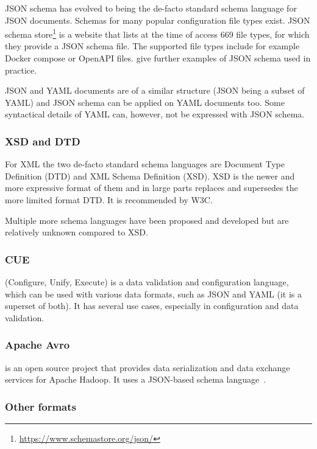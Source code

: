 \documentclass[lettersize,journal]{IEEEtran}
\newcommand{\cfgfile}{configuration file}
\begin{document}
JSON schema has evolved to being the de-facto standard schema language for JSON documents. Schemas for many popular \cfgfile{} types exist. JSON schema store\footnote{\url{https://www.schemastore.org/json/}} is a website that lists at the time of access 669 file types, for which they provide a JSON schema file. The supported file types include for example Docker compose or OpenAPI files. \cite{barbaglia, ChaeronySiffa2022} give further examples of JSON schema used in practice. 


JSON and YAML documents are of a similar structure (JSON being a subset of YAML) and JSON schema can be applied on YAML documents too. Some syntactical details of YAML can, however, not be expressed with JSON schema. 

\subsubsection{XSD and DTD}
For XML the two de-facto standard schema languages are Document Type Definition (DTD)\cite{dtd_spec} and XML Schema Definition (XSD)\cite{xsd_spec}. 
XSD is the newer and more expressive format of them and in large parts replaces and supersedes the more limited format DTD\cite{dtd_vs_xsd}. 
It is recommended by W3C\cite{xsd_spec}. 

Multiple more schema languages have been proposed and developed but are relatively unknown compared to XSD\cite{xml_schemas_1}\cite{xml_schemas_2}.

\subsubsection{CUE}\cite{cuelang} %
(Configure, Unify, Execute) is a data validation and configuration language, which can be used with various data formats, such as JSON and YAML (it is a superset of both).
It has several use cases, especially in configuration and data validation.


\subsubsection{Apache Avro}%
is an open source project that provides data serialization and data exchange services for Apache Hadoop.
It uses a JSON-based schema language~\cite{Apache-Avro}.


\subsubsection{Other formats}
\end{document}
